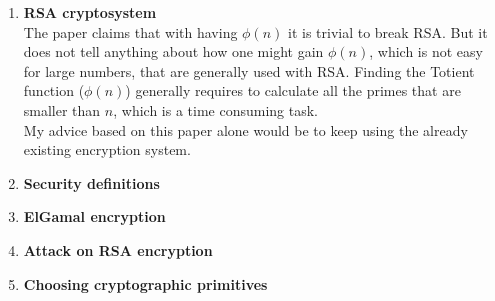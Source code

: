 \documentclass{article}
\begin{document}
	\homeworktitle
	
	\begin{enumerate}[label=\textbf{Task \arabic*:}]
		\item \textbf{RSA cryptosystem}\\
		The paper claims that with having $\phi(n)$ it is trivial to break RSA. But it does not tell anything about how one might gain $\phi(n)$, which is not easy for large numbers, that are generally used with RSA. Finding the Totient function ($\phi(n)$) generally requires to calculate all the primes that are smaller than $n$, which is a time consuming task.\\
		My advice based on this paper alone would be to keep using the already existing encryption system.
		\item \textbf{Security definitions}\\
		
		\item \textbf{ElGamal encryption}
		\item \textbf{Attack on RSA encryption}
		\item \textbf{Choosing cryptographic primitives}
	\end{enumerate}
	
\end{document}

